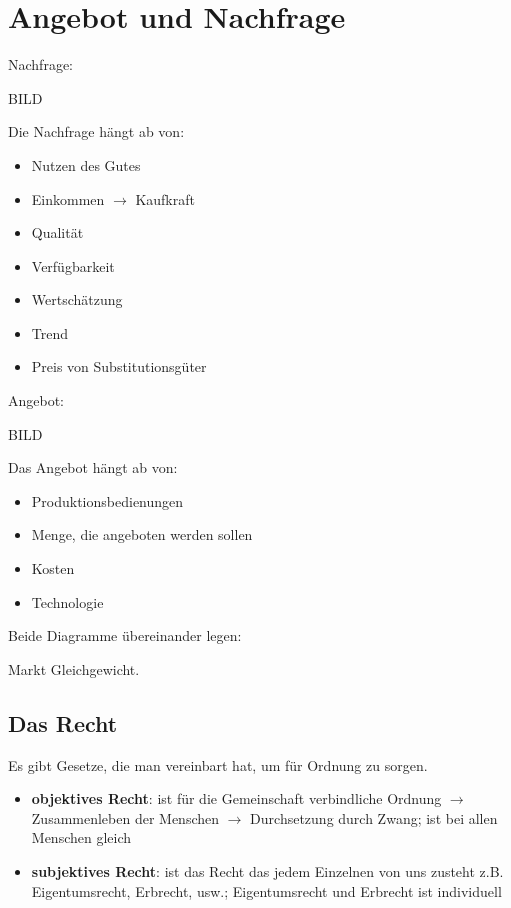 \documentclass[a4paper]{report}
\begin{document}
\chapter{Angebot und Nachfrage}

Nachfrage:
\newline
\newline

BILD

Die Nachfrage hängt ab von:

\begin{itemize}
\item Nutzen des Gutes
\item Einkommen $\rightarrow$ Kaufkraft
\item Qualität
\item Verfügbarkeit
\item Wertschätzung
\item Trend
\item Preis von Substitutionsgüter
\end{itemize}

Angebot:

BILD

Das Angebot hängt ab von:

\begin{itemize}
\item Produktionsbedienungen
\item Menge, die angeboten werden sollen
\item Kosten
\item Technologie
\end{itemize}

Beide Diagramme übereinander legen:
\newline
\newline

Markt Gleichgewicht.

\newpage

\section{Das Recht}

Es gibt Gesetze, die man vereinbart hat, um für Ordnung zu sorgen.

\begin{itemize}
\item \textbf{objektives Recht}: ist für die Gemeinschaft verbindliche Ordnung $\rightarrow$ Zusammenleben der Menschen $\rightarrow$ Durchsetzung durch Zwang; ist bei allen Menschen gleich
\item \textbf{subjektives Recht}: ist das Recht das jedem Einzelnen von uns zusteht z.B. Eigentumsrecht, Erbrecht, usw.; Eigentumsrecht und Erbrecht ist individuell
\end{itemize}
\end{document}
